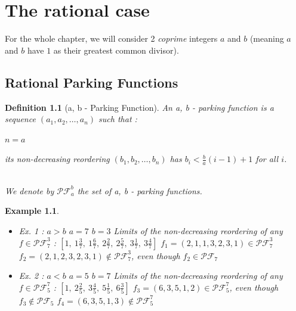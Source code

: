 \documentclass[12pt]{report}
\newtheorem{definition}{Definition}
\newtheorem*{example}{Example}
\begin{document}
\chapter{The rational case}

For the whole chapter, we will consider 2 \emph{coprime}
integers $a$ and $b$ (meaning $a$ and $b$ have $1$ as their
greatest common divisor).

\section{Rational Parking Functions}

\begin{definition}[a, b - Parking Function]
    An \emph{a, b - parking function} is a sequence 
    $(a_1, a_2, \ldots, a_n)$ such that :\\
    \begin{itemize*}
        \item $n = a$\\
        \item its non-decreasing reordering 
        $(b_1, b_2, \ldots, b_n)$
        has $b_i < \frac{b}{a}(i-1) + 1$ for all $i$.\\\\
    \end{itemize*}
    We denote by $\mathcal{PF}^b_a$ the set of 
    a, b - parking functions.
\end{definition}

\begin{example}
    ~\\
    \begin{itemize}
        \item Ex. 1 : $a > b$
            \subitem $a = 7$
            \subitem $b = 3$
            \subitem Limits of the non-decreasing
            reordering of any $f \in \mathcal{PF}^3_7$ :
            \subitem $[1,\ 1 \frac{3}{7},\ 1 \frac{6}{7},\ 
            2 \frac{2}{7},\ 2 \frac{5}{7},\ 3 \frac{1}{7},\ 
            3 \frac{4}{7}]$
            \subitem $f_1 = (2, 1, 1, 3, 2, 3, 1) \in
            \mathcal{PF}^3_7$
            \subitem $f_2 = (2, 1, 2, 3, 2, 3, 1) \notin
            \mathcal{PF}^3_7$, even though $f_2 \in
            \mathcal{PF}_7$
        \item Ex. 2 : $a < b$
            \subitem $a = 5$
            \subitem $b = 7$
            \subitem Limits of the non-decreasing            
            reordering of any $f \in \mathcal{PF}^7_5$ :
            \subitem $[1,\ 2 \frac{2}{5},\ 3 \frac{4}{5},\ 
            5 \frac{1}{5},\ 6 \frac{3}{5}]$
            \subitem $f_3 = (6, 3, 5, 1, 2) \in
            \mathcal{PF}^7_5$, even though $f_3 \notin
            \mathcal{PF}_5$
            \subitem $f_4 = (6, 3, 5, 1, 3) \notin
            \mathcal{PF}^7_5$\\
    \end{itemize}
\end{example}
\end{document}
